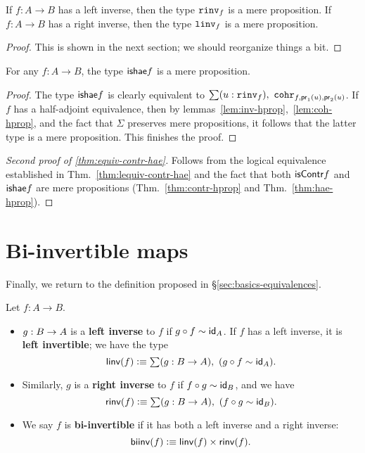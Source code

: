 \begin{lem}\label{lem:inv-hprop}
If $f : A \to B$ has a left inverse, then the type $\rin{f}$ is a mere proposition. If $f : A \to B$ has a right inverse, then the type $\lin{f}$ is a mere proposition.
\end{lem}
\begin{proof}
This is shown in the next section; we should reorganize things a bit.
\end{proof}

\begin{thm}\label{thm:hae-hprop}
For any $f : A \to B$, the type $\ishae{f}$ is a mere proposition.
\end{thm}
\begin{proof}
The type $\ishae{f}$ is clearly equivalent to $\sm{u : \rin{f}} \rcoh{f}{\proj{1}(u)}{\proj{2}(u)}$. If $f$ has a half-adjoint equivalence, then by lemmas~\ref{lem:inv-hprop},~\ref{lem:coh-hprop}, and the fact that $\Sigma$ preserves mere propositions, it follows that the latter type is a mere proposition. This finishes the proof.
\end{proof}

\begin{proof}[Second proof of \autoref{thm:equiv-contr-hae}]
Follows from the logical equivalence established in Thm.~\ref{thm:lequiv-contr-hae} and the fact that both $\iscontr{f}$ and $\ishae{f}$ are mere propositions (Thm.~\ref{thm:contr-hprop} and Thm.~\ref{thm:hae-hprop}).
\end{proof}


\section{Bi-invertible maps}
\label{sec:biinv}

Finally, we return to the definition proposed in \S\ref{sec:basics-equivalences}.

\begin{defn}
  Let $f:A\to B$.
  \begin{itemize}
  \item $g:B\ra A$ is a \textbf{left inverse} to $f$ if $g\circ f\htpy \idfunc[A]$.
    If $f$ has a left inverse, it is \textbf{left invertible}; we have the type
    \[ \linv(f) \defeq \sm{g:B\to A} (g\circ f\htpy \idfunc[A]). \]
  \item Similarly, $g$ is a \textbf{right inverse} to $f$ if $f\circ g\htpy \idfunc[B]$, and we have
    \[ \rinv(f) \defeq \sm{g:B\to A} (f\circ g\htpy \idfunc[B]). \]
  \item We say $f$ is \textbf{bi-invertible} if it has both a left inverse and a right inverse:
    \[ \biinv (f) \defeq \linv(f) \times \rinv(f). \]
  \end{itemize}
\end{defn}

